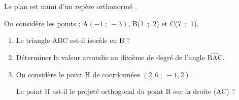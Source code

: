 \medskip
Le plan est muni d'un repère orthonormé \Oij.

On considère les points : A$(-1~;~- 3)$, B(1~;~2) et C(7~;~1).

\medskip

\begin{enumerate}
\item Le triangle ABC est-il isocèle en B ?
\item Déterminer la valeur arrondie au dixième de degré de l'angle $\widehat{\text{BAC}}$.
\item On considère le point H de coordonnées $(2,6~;~- 1,2)$.

Le point H est-il le projeté orthogonal du point B sur la droite (AC) ?
\end{enumerate}

\bigskip
